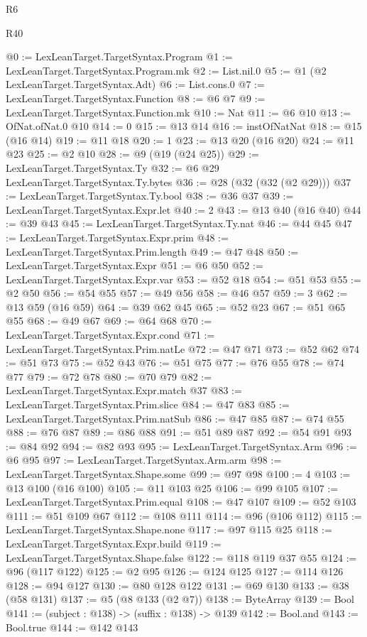 \begin{lexlean}{R6}
\begin{lexlean}{R40}
\begin{coremodule}
{{{{{@0 := LexLeanTarget.TargetSyntax.Program
@1 := LexLeanTarget.TargetSyntax.Program.mk
@2 := List.nil.{0}
@5 := @1 (@2 LexLeanTarget.TargetSyntax.Adt)
@6 := List.cons.{0}
@7 := LexLeanTarget.TargetSyntax.Function
@8 := @6 @7
@9 := LexLeanTarget.TargetSyntax.Function.mk
@10 := Nat
@11 := @6 @10
@13 := OfNat.ofNat.{0} @10
@14 := 0
@15 := @13 @14
@16 := instOfNatNat
@18 := @15 (@16 @14)
@19 := @11 @18
@20 := 1
@23 := @13 @20 (@16 @20)
@24 := @11 @23
@25 := @2 @10
@28 := @9 (@19 (@24 @25))
@29 := LexLeanTarget.TargetSyntax.Ty
@32 := @6 @29 LexLeanTarget.TargetSyntax.Ty.bytes
@36 := @28 (@32 (@32 (@2 @29)))
@37 := LexLeanTarget.TargetSyntax.Ty.bool
@38 := @36 @37
@39 := LexLeanTarget.TargetSyntax.Expr.let
@40 := 2
@43 := @13 @40 (@16 @40)
@44 := @39 @43
@45 := LexLeanTarget.TargetSyntax.Ty.nat
@46 := @44 @45
@47 := LexLeanTarget.TargetSyntax.Expr.prim
@48 := LexLeanTarget.TargetSyntax.Prim.length
@49 := @47 @48
@50 := LexLeanTarget.TargetSyntax.Expr
@51 := @6 @50
@52 := LexLeanTarget.TargetSyntax.Expr.var
@53 := @52 @18
@54 := @51 @53
@55 := @2 @50
@56 := @54 @55
@57 := @49 @56
@58 := @46 @57
@59 := 3
@62 := @13 @59 (@16 @59)
@64 := @39 @62 @45
@65 := @52 @23
@67 := @51 @65 @55
@68 := @49 @67
@69 := @64 @68
@70 := LexLeanTarget.TargetSyntax.Expr.cond
@71 := LexLeanTarget.TargetSyntax.Prim.natLe
@72 := @47 @71
@73 := @52 @62
@74 := @51 @73
@75 := @52 @43
@76 := @51 @75
@77 := @76 @55
@78 := @74 @77
@79 := @72 @78
@80 := @70 @79
@82 := LexLeanTarget.TargetSyntax.Expr.match @37
@83 := LexLeanTarget.TargetSyntax.Prim.slice
@84 := @47 @83
@85 := LexLeanTarget.TargetSyntax.Prim.natSub
@86 := @47 @85
@87 := @74 @55
@88 := @76 @87
@89 := @86 @88
@91 := @51 @89 @87
@92 := @54 @91
@93 := @84 @92
@94 := @82 @93
@95 := LexLeanTarget.TargetSyntax.Arm
@96 := @6 @95
@97 := LexLeanTarget.TargetSyntax.Arm.arm
@98 := LexLeanTarget.TargetSyntax.Shape.some
@99 := @97 @98
@100 := 4
@103 := @13 @100 (@16 @100)
@105 := @11 @103 @25
@106 := @99 @105
@107 := LexLeanTarget.TargetSyntax.Prim.equal
@108 := @47 @107
@109 := @52 @103
@111 := @51 @109 @67
@112 := @108 @111
@114 := @96 (@106 @112)
@115 := LexLeanTarget.TargetSyntax.Shape.none
@117 := @97 @115 @25
@118 := LexLeanTarget.TargetSyntax.Expr.build
@119 := LexLeanTarget.TargetSyntax.Shape.false
@122 := @118 @119 @37 @55
@124 := @96 (@117 @122)
@125 := @2 @95
@126 := @124 @125
@127 := @114 @126
@128 := @94 @127
@130 := @80 @128 @122
@131 := @69 @130
@133 := @38 (@58 @131)
@137 := @5 (@8 @133 (@2 @7))
@138 := ByteArray
@139 := Bool
@141 := (subject : @138) -> (suffix : @138) -> @139
@142 := Bool.and
@143 := Bool.true
@144 := @142 @143
}}}}}
\end{coremodule}
\end{lexlean}
\end{lexlean}
